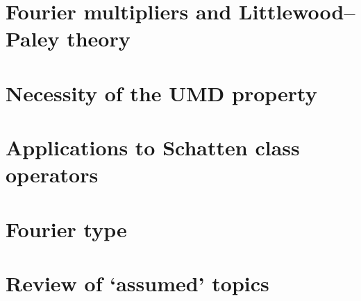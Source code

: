 \documentclass[a4paper,10pt]{amsbook}
\begin{document}
\chapter{Fourier multipliers and Littlewood--Paley theory}
\label{sec:Fourier-multipliers}


\chapter{Necessity of the UMD property}
\label{sec:UMD-necessity}


\chapter{Applications to Schatten class operators}
\label{sec:schatten}


\chapter{Fourier type}
\label{sec:fouriertype}



\appendix
\chapter{Review of `assumed' topics}
\label{sec:appendices}






 

\printindex
\end{document}
